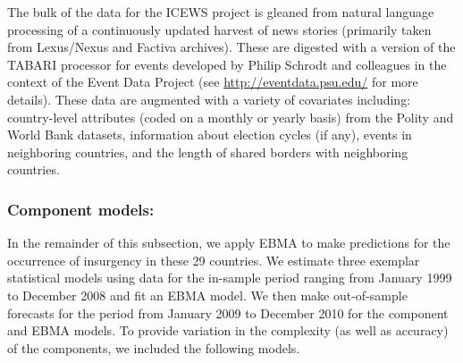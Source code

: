 The bulk of the data for the ICEWS project is gleaned from natural
language processing of a continuously updated harvest of news stories
(primarily taken from Lexus/Nexus and Factiva archives). These are
digested with a version of the TABARI processor for events developed
by Philip Schrodt and colleagues in the context of the Event Data
Project (see \url{http://eventdata.psu.edu/} for more details).  These
data are augmented with a variety of covariates including:
country-level attributes (coded on a monthly or yearly basis) from the
Polity and World Bank datasets, information about election cycles (if
any), events in neighboring countries, and the length of shared
borders with neighboring countries.

\subsubsection{Component models:}

In the remainder of this subsection, we apply EBMA to make predictions
for the occurrence of insurgency in these 29 countries.  We estimate
three exemplar statistical models using data for the in-sample period
ranging from January 1999 to December 2008 and fit an EBMA model.  We
then make out-of-sample forecasts for the period from January 2009 to
December 2010 for the component and EBMA models.  To provide variation
in the complexity (as well as accuracy) of the components, we included
the following models.

